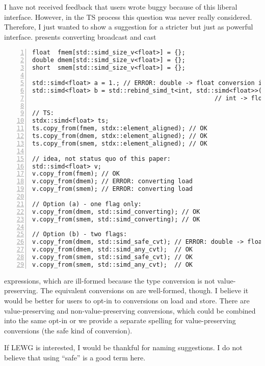 I have not received feedback that users wrote buggy because of this liberal
interface.
However, in the TS process this question was never really considered.
Therefore, I just wanted to show a suggestion for a stricter but just as
powerful interface.
 presents converting broadcast and cast
\begin{lstlisting}[numbers=left,float={hbtp},label=lst:saferConvertingLoads,caption={
    Load-store flags as opt-in to converting loads and stores
}]
float  fmem[std::simd_size_v<float>] = {};
double dmem[std::simd_size_v<float>] = {};
short  smem[std::simd_size_v<float>] = {};

std::simd<float> a = 1.; // ERROR: double -> float conversion is not value-preserving
std::simd<float> b = std::rebind_simd_t<int, std::simd<float>>(1); // ERROR:
                                                  // int -> float is not value-preserving

// TS:
stdx::simd<float> ts;
ts.copy_from(fmem, stdx::element_aligned); // OK
ts.copy_from(dmem, stdx::element_aligned); // OK
ts.copy_from(smem, stdx::element_aligned); // OK

// idea, not status quo of this paper:
std::simd<float> v;
v.copy_from(fmem); // OK
v.copy_from(dmem); // ERROR: converting load
v.copy_from(smem); // ERROR: converting load

// Option (a) - one flag only:
v.copy_from(dmem, std::simd_converting); // OK
v.copy_from(smem, std::simd_converting); // OK

// Option (b) - two flags:
v.copy_from(dmem, std::simd_safe_cvt); // ERROR: double -> float is not value-preserving
v.copy_from(dmem, std::simd_any_cvt);  // OK
v.copy_from(smem, std::simd_safe_cvt); // OK
v.copy_from(smem, std::simd_any_cvt);  // OK
\end{lstlisting}
expressions, which are ill-formed because the type conversion is not
value-preserving.
The equivalent conversions on  are well-formed, though.
I believe it would be better for users to opt-in to conversions on load and
store.
There are value-preserving and non-value-preserving conversions, which could be
combined into the same opt-in or we provide a separate spelling for
value-preserving conversions (the safe kind of conversion).

If LEWG is interested, I would be thankful for naming suggestions.
I do not believe that using ``safe'' is a good term here.

%

